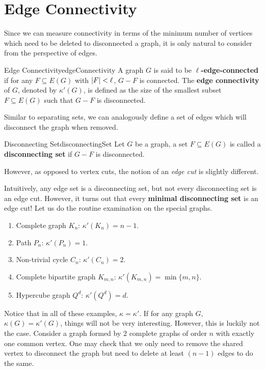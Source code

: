 \documentclass[math]{amznotes}
\makeatletter
\let\save@mathaccent\mathaccent
\newcommand*\if@single[3]{%
  \setbox0\hbox{${\mathaccent"0362{#1}}^H$}%
  \setbox2\hbox{${\mathaccent"0362{\kern0pt#1}}^H$}%
  \ifdim\ht0=\ht2 #3\else #2\fi
  }
\newcommand*\rel@kern[1]{\kern#1\dimexpr\macc@kerna}
\newcommand*\widebar[1]{\@ifnextchar^{{\wide@bar{#1}{0}}}{\wide@bar{#1}{1}}}
\newcommand*\wide@bar[2]{\if@single{#1}{\wide@bar@{#1}{#2}{1}}{\wide@bar@{#1}{#2}{2}}}
\newcommand*\wide@bar@[3]{%
  \begingroup
  \def\mathaccent##1##2{%
    \let\mathaccent\save@mathaccent
    \if#32 \let\macc@nucleus\first@char \fi
    \setbox\z@\hbox{$\macc@style{\macc@nucleus}_{}$}%
    \setbox\tw@\hbox{$\macc@style{\macc@nucleus}{}_{}$}%
    \dimen@\wd\tw@
    \advance\dimen@-\wd\z@
    \divide\dimen@ 3
    \@tempdima\wd\tw@
    \advance\@tempdima-\scriptspace
    \divide\@tempdima 10
    \advance\dimen@-\@tempdima
    \ifdim\dimen@>\z@ \dimen@0pt\fi
    \rel@kern{0.6}\kern-\dimen@
    \if#31
      \overline{\rel@kern{-0.6}\kern\dimen@\macc@nucleus\rel@kern{0.4}\kern\dimen@}%
      \advance\dimen@0.4\dimexpr\macc@kerna
      \let\final@kern#2%
      \ifdim\dimen@<\z@ \let\final@kern1\fi
      \if\final@kern1 \kern-\dimen@\fi
    \else
      \overline{\rel@kern{-0.6}\kern\dimen@#1}%
    \fi
  }%
  \macc@depth\@ne
  \let\math@bgroup\@empty \let\math@egroup\macc@set@skewchar
  \mathsurround\z@ \frozen@everymath{\mathgroup\macc@group\relax}%
  \macc@set@skewchar\relax
  \let\mathaccentV\macc@nested@a
  \if#31
    \macc@nested@a\relax111{#1}%
  \else
    \def\gobble@till@marker##1\endmarker{}%
    \futurelet\first@char\gobble@till@marker#1\endmarker
    \ifcat\noexpand\first@char A\else
      \def\first@char{}%
    \fi
    \macc@nested@a\relax111{\first@char}%
  \fi
  \endgroup
}
\theoremstyle{remark}
\makeatother
\begin{document}
\section{Edge Connectivity}
Since we can measure connectivity in terms of the minimum number of vertices which need to be deleted to disconnected a graph, it is only natural to consider from the perspective of edges.
\begin{dfnbox}{Edge Connectivity}{edgeConnectivity}
    A graph $G$ is said to be {\color{red} \textbf{$\ell$-edge-connected}} if for any $F \subseteq E(G)$ with ${\left\lvert {F} \right\rvert} < \ell$, $G - F$ is connected. The {\color{red} \textbf{edge connectivity}} of $G$, denoted by $\kappa'(G)$, is defined as the size of the smallest subset $F \subseteq E(G)$ such that $G - F$ is disconnected.
\end{dfnbox}
Similar to separating sets, we can analogously define a set of edges which will disconnect the graph when removed.
\begin{dfnbox}{Disconnecting Set}{disconnectingSet}
    Let $G$ be a graph, a set $F \subseteq E(G)$ is called a {\color{red} \textbf{disconnecting set}} if $G - F$ is disconnected.
\end{dfnbox}
However, as opposed to vertex cuts, the notion of an \textit{edge cut} is slightly different.
Intuitively, any edge set is a disconnecting set, but not every disconnecting set is an edge cut. However, it turns out that every \textbf{minimal disconnecting set} is an edge cut! Let us do the routine examination on the special graphs.
\begin{enumerate}
    \item Complete graph $K_n$: $\kappa'(K_n) = n - 1$.
    \item Path $P_n$: $\kappa'(P_n) = 1$.
    \item Non-trivial cycle $C_n$: $\kappa'(C_n) = 2$.
    \item Complete bipartite graph $K_{m, n}$: $\kappa'(K_{m, n}) = \min\{m, n\}$.
    \item Hypercube graph $Q^d$: $\kappa'\left(Q^d\right) = d$.
\end{enumerate}
Notice that in all of these examples, $\kappa = \kappa'$. If for any graph $G$, $\kappa(G) = \kappa'(G)$, things will not be very interesting. However, this is luckily not the case. Consider a graph formed by $2$ complete graphs of order $n$ with exactly one common vertex. One may check that we only need to remove the shared vertex to disconnect the graph but need to delete at least $(n - 1)$ edges to do the same.
\end{document}
